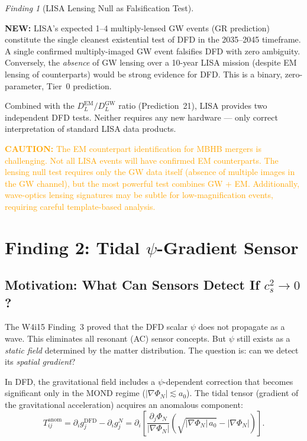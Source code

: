 \documentclass[11pt]{article}
\theoremstyle{definition}
\theoremstyle{remark}
\newtheorem{finding}[theorem]{Finding}
\newcommand{\caution}[1]{\textcolor{orange}{\textbf{CAUTION:} #1}}
\newcommand{\newresult}[1]{\textcolor{green!50!black}{\textbf{NEW:} #1}}
\begin{document}
\begin{finding}[LISA Lensing Null as Falsification Test]
\label{find:lisa}
\newresult{LISA's expected 1--4 multiply-lensed GW events (GR
prediction) constitute the single cleanest existential test of
DFD in the 2035--2045 timeframe.  A single confirmed multiply-imaged
GW event falsifies DFD with zero ambiguity.  Conversely, the
\emph{absence} of GW lensing over a 10-year LISA mission (despite
EM lensing of counterparts) would be strong evidence for DFD.
This is a binary, zero-parameter, Tier~0 prediction.

Combined with the $D_L^{\mathrm{EM}}/D_L^{\mathrm{GW}}$ ratio
(Prediction~21), LISA provides two independent DFD tests.
Neither requires any new hardware --- only correct interpretation
of standard LISA data products.}

\caution{The EM counterpart identification for MBHB mergers
is challenging.  Not all LISA events will have confirmed EM
counterparts.  The lensing null test requires only the GW
data itself (absence of multiple images in the GW channel),
but the most powerful test combines GW + EM.  Additionally,
wave-optics lensing signatures may be subtle for low-magnification
events, requiring careful template-based analysis.}
\end{finding}

\section{Finding 2: Tidal $\psi$-Gradient Sensor}
\label{sec:tidal}

\subsection{Motivation: What Can Sensors Detect If $c_s^2 \to 0$?}

The W4i15 Finding~3 proved that the DFD scalar $\psi$ does not
propagate as a wave.  This eliminates all resonant (AC) sensor
concepts.  But $\psi$ still exists as a \emph{static field}
determined by the matter distribution.  The question is: can we
detect its \emph{spatial gradient}?

In DFD, the gravitational field includes a $\psi$-dependent
correction that becomes significant only in the MOND regime
($|\nabla\Phi_N| \lesssim a_0$).  The tidal tensor (gradient of
the gravitational acceleration) acquires an anomalous component:
\begin{equation}
T_{ij}^{\mathrm{anom}} = \partial_i g_j^{\mathrm{DFD}}
  - \partial_i g_j^{N}
  = \partial_i\left[\frac{\partial_j \Phi_N}{|\nabla\Phi_N|}
  \left(\sqrt{|\nabla\Phi_N|\,a_0} - |\nabla\Phi_N|\right)\right].
\label{eq:tidal-anom}
\end{equation}
\end{document}
